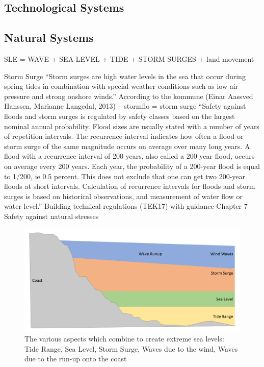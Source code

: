 \subsection{Technological Systems}

\subsection{Natural Systems }
SLE = WAVE + SEA LEVEL + TIDE + STORM SURGES + land movement

Storm Surge
“Storm surges are high water levels in the sea that occur during spring tides in combination with special weather conditions such as low air pressure and strong onshore winds.” According to the kommune (Einar Aassved Hanssen, Marianne Langedal, 2013) – stormflo = storm surge
“Safety against floods and storm surges is regulated by safety classes based on the
largest nominal annual probability. Flood sizes are usually stated with a number of
years of repetition intervals. The recurrence interval indicates how often a flood or
storm surge of the same magnitude occurs on average over many long years. A flood
with a recurrence interval of 200 years, also called a 200-year flood, occurs on average
every 200 years. Each year, the probability of a 200-year flood is equal to 1/200, ie 0.5 percent.
This does not exclude that one can get two 200-year floods at short intervals.
Calculation of recurrence intervals for floods and storm surges is based on historical
observations, and measurement of water flow or water level.”
Building technical regulations (TEK17) with guidance Chapter 7 Safety against natural stresses

\begin{figure}[h]
    \centering
    \includegraphics[width=1\textwidth]{fig_theory/sea level extremes.png}

    \caption{The various aspects which combine to create extreme sea levels: Tide Range, Sea Level, Storm Surge, Waves due to the wind, Waves due to the run-up onto the coast}
    \label{fig:my_label}
\end{figure}


